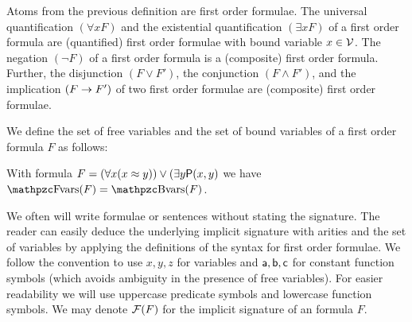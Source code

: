 
\begin{definition}\label{def:syntax:FOF}
	Atoms from the previous definition are {\myem first order formulae}.  
	The universal quantification $(\forall x F)$ 
	and the existential quantification $(\exists x F)$ 
	of a first order formula are (quantified) first order formulae
	with {\myem bound} variable $x\in{\mathcal V}$.
	The negation $(\lnot F)$ of a first order formula
	is a (composite) first order formula.
	Further, the disjunction $(F \lor F')$, 
	the conjunction $(F \land F') $, 
	and the implication $(F \rightarrow F')$ 
	of two first order formulae
	are (composite) first order formulae.
\end{definition}

\begin{definition}\label{def:fof:fvars}\label{def:fof:bvars}
	We define the set of {\myem free} variables and the set of {\myem bound} variables 
	of a first order formula $F$ as follows:
\end{definition}

\begin{example}
	With formula $F = (\forall x (x\approx y)) \lor (\exists y {\mathsf P}(x,y)$ we have $\fvar(F) = \bvar(F)$.
\end{example}

We often will write formulae or sentences 
without stating the signature.
The reader can easily deduce the underlying {\myem implicit} signature with arities 
and the set of variables by applying the definitions of the syntax for first order formulae.
We follow the convention to use $x,y,z$ for variables 
and ${\mathsf a},{\mathsf b},{\mathsf c}$ for constant function symbols 
(which avoids ambiguity in the presence of free variables). 
For easier readability we will use uppercase predicate symbols and lowercase function symbols.
We may denote ${\mathcal F}(F)$ for the implicit signature of an formula $F$.

